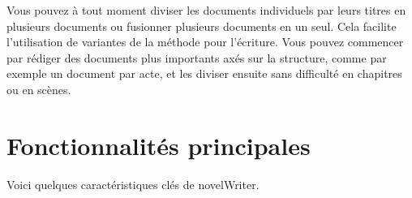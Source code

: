 \documentclass[a4paper,11pt,french]{sphinxmanual}
\begin{document}
\sphinxAtStartPar
Vous pouvez à tout moment diviser les documents individuels par leurs titres en plusieurs documents ou fusionner plusieurs documents en un seul. Cela facilite l’utilisation de variantes de la méthode  pour l’écriture. Vous pouvez commencer par rédiger des documents plus importants axés sur la structure, comme par exemple un document par acte, et les diviser ensuite sans difficulté en chapitres ou en scènes.


\section{Fonctionnalités principales}
\label{\detokenize{int_introduction:key-features}}\label{\detokenize{int_introduction:a-intro-features}}
\sphinxAtStartPar
Voici quelques caractéristiques clés de novelWriter.
\end{document}
